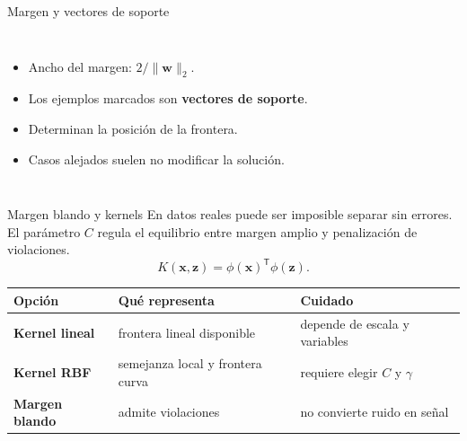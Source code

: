 \documentclass[aspectratio=169,10pt]{beamer}
\newcommand{\concepto}[1]{\textcolor{UAPTeal}{\textbf{#1}}}
\begin{document}
\begin{frame}{Margen y vectores de soporte}
  \begin{columns}[T]
    \centering
    \small
    \begin{itemize}
      \item Ancho del margen: $2/\|\mathbf{w}\|_2$.
      \item Los ejemplos marcados son \concepto{vectores de soporte}.
      \item Determinan la posición de la frontera.
      \item Casos alejados suelen no modificar la solución.
    \end{itemize}
  \end{columns}
\end{frame}

\begin{frame}{Margen blando y kernels}
  \small
  En datos reales puede ser imposible separar sin errores. El parámetro $C$ regula el equilibrio entre margen amplio y penalización de violaciones.
  \[
    K(\mathbf{x},\mathbf{z})=\phi(\mathbf{x})^{\mathsf T}\phi(\mathbf{z}).
  \]
  \begin{tabularx}{\textwidth}{>{\bfseries}p{}XX}\toprule
  Opción & Qué representa & Cuidado\\\midrule
  Kernel lineal & frontera lineal disponible & depende de escala y variables\\
  Kernel RBF & semejanza local y frontera curva & requiere elegir $C$ y $\gamma$\\
  Margen blando & admite violaciones & no convierte ruido en señal\\\bottomrule
  \end{tabularx}
\end{frame}
\end{document}
